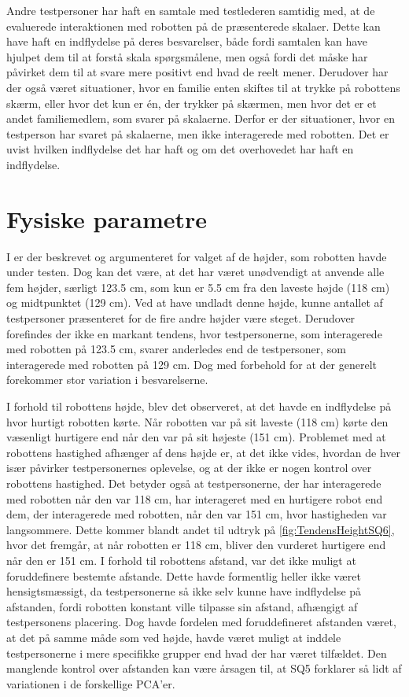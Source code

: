 Andre testpersoner har haft en samtale med testlederen samtidig med, at de evaluerede interaktionen med robotten på de præsenterede skalaer. Dette kan have haft en indflydelse på deres besvarelser, både fordi samtalen kan have hjulpet dem til at forstå skala spørgsmålene, men også fordi det måske har påvirket dem til at svare mere positivt end hvad de reelt mener. Derudover har der også været situationer, hvor en familie enten skiftes til at trykke på robottens skærm, eller hvor det kun er én, der trykker på skærmen, men hvor det er et andet familiemedlem, som svarer på skalaerne. Derfor er der situationer, hvor en testperson har svaret på skalaerne, men ikke interagerede med robotten. Det er uvist hvilken indflydelse det har haft og om det overhovedet har haft en indflydelse.  


\section{Fysiske parametre}
\label{DiskussionFysiskeParametre}
%
I  er der beskrevet og argumenteret for valget af de højder, som robotten havde under testen. Dog kan det være, at det har været unødvendigt at anvende alle fem højder, særligt 123.5 cm, som kun er 5.5 cm fra den laveste højde (118 cm) og midtpunktet (129 cm). Ved at have undladt denne højde, kunne antallet af testpersoner præsenteret for de fire andre højder være steget. Derudover forefindes der ikke en markant tendens, hvor testpersonerne, som interagerede med robotten på 123.5 cm, svarer anderledes end de testpersoner, som interagerede med robotten på 129 cm. Dog med forbehold for at der generelt forekommer stor variation i besvarelserne. 

I forhold til robottens højde, blev det observeret, at det havde en indflydelse på hvor hurtigt robotten kørte. Når robotten var på sit laveste (118 cm) kørte den væsenligt hurtigere end når den var på sit højeste (151 cm). Problemet med at robottens hastighed afhænger af dens højde er, at det ikke vides, hvordan de hver især påvirker testpersonernes oplevelse, og at der ikke er nogen kontrol over robottens hastighed. Det betyder også at testpersonerne, der har interagerede med robotten når den var 118 cm, har interageret med en hurtigere robot end dem, der interagerede med robotten, når den var 151 cm, hvor hastigheden var langsommere. Dette kommer blandt andet til udtryk på \autoref{fig:TendensHeightSQ6}, hvor det fremgår, at når robotten er 118 cm, bliver den vurderet hurtigere end når den er 151 cm. \blankline
%
I forhold til robottens afstand, var det ikke muligt at foruddefinere bestemte afstande. Dette havde formentlig heller ikke været hensigtsmæssigt, da testpersonerne så ikke selv kunne have indflydelse på afstanden, fordi robotten konstant ville tilpasse sin afstand, afhængigt af testpersonens placering. Dog havde fordelen med foruddefineret afstanden været, at det på samme måde som ved højde, havde været muligt at inddele testpersonerne i mere specifikke grupper end hvad der har været tilfældet. Den manglende kontrol over afstanden kan være årsagen til, at SQ5 forklarer så lidt af variationen i de forskellige PCA'er.

